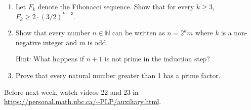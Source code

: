 \documentclass[12pt]{article}
\begin{document}
\begin{enumerate}[resume]
\item 
Let $F_k$ denote the Fibonacci sequence. Show that for every $k \geq 3$, $F_k \geq 2\cdot (3/2)^{k-3}$.


\item Show that every number $n\in \mathbb N$ can be written as $n=2^km$ where $k$ is a non-negative integer and $m$ is odd.

Hint: What happens if $n+1$ is not prime in the induction step?

\item Prove that every natural number greater than 1 has a prime factor.


\end{enumerate}

Before next week, watch videos 22 and 23 in \url{https://personal.math.ubc.ca/~PLP/auxiliary.html}.
\end{document}
